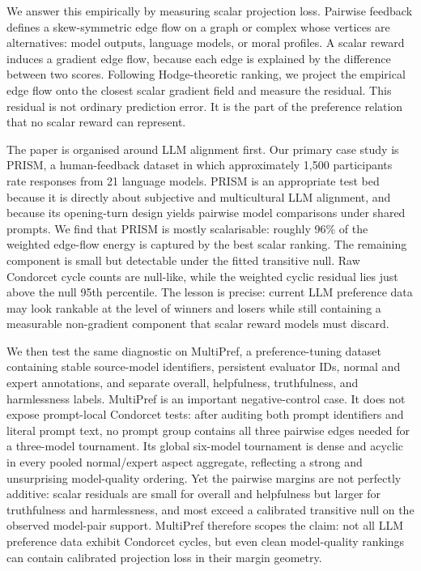 \documentclass[10pt]{article}
\theoremstyle{definition}
\theoremstyle{remark}
\begin{document}
We answer this empirically by measuring scalar projection loss. Pairwise feedback defines a skew-symmetric edge flow on a graph or complex whose vertices are alternatives: model outputs, language models, or moral profiles. A scalar reward induces a gradient edge flow, because each edge is explained by the difference between two scores. Following Hodge-theoretic ranking\cite{jiang2011}, we project the empirical edge flow onto the closest scalar gradient field and measure the residual. This residual is not ordinary prediction error. It is the part of the preference relation that no scalar reward can represent.

The paper is organised around LLM alignment first. Our primary case study is PRISM\cite{kirk2024}, a human-feedback dataset in which approximately 1,500 participants rate responses from 21 language models. PRISM is an appropriate test bed because it is directly about subjective and multicultural LLM alignment, and because its opening-turn design yields pairwise model comparisons under shared prompts. We find that PRISM is mostly scalarisable: roughly 96\% of the weighted edge-flow energy is captured by the best scalar ranking. The remaining component is small but detectable under the fitted transitive null. Raw Condorcet cycle counts are null-like, while the weighted cyclic residual lies just above the null 95th percentile. The lesson is precise: current LLM preference data may look rankable at the level of winners and losers while still containing a measurable non-gradient component that scalar reward models must discard.

We then test the same diagnostic on MultiPref\cite{miranda2025}, a preference-tuning dataset containing stable source-model identifiers, persistent evaluator IDs, normal and expert annotations, and separate overall, helpfulness, truthfulness, and harmlessness labels. MultiPref is an important negative-control case. It does not expose prompt-local Condorcet tests: after auditing both prompt identifiers and literal prompt text, no prompt group contains all three pairwise edges needed for a three-model tournament. Its global six-model tournament is dense and acyclic in every pooled normal/expert aspect aggregate, reflecting a strong and unsurprising model-quality ordering. Yet the pairwise margins are not perfectly additive: scalar residuals are small for overall and helpfulness but larger for truthfulness and harmlessness, and most exceed a calibrated transitive null on the observed model-pair support. MultiPref therefore scopes the claim: not all LLM preference data exhibit Condorcet cycles, but even clean model-quality rankings can contain calibrated projection loss in their margin geometry.
\end{document}
